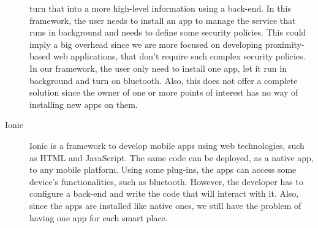 \begin{description}
  turn that into a more high-level information 
  using a back-end. In this framework,
  the user needs to install an app to manage the service
  that runs in background and needs to define some
  security policies. This could imply a big overhead since
  we are more focused on developing proximity-based
  web applications, that don't require such complex security
  policies. In our framework, the user only need to
  install one app, let it run in background and turn on
  bluetooth. Also, this does not offer a complete solution
  since the owner of one or more points of interest
  has no way of installing new apps on them.
  \item[Ionic] Ionic is a framework to develop mobile apps
  using web technologies, such as HTML and JavaScript. The
  same code can be deployed, as a native app, to any mobile
  platform. Using some plug-ins, the apps can access some
  device's functionalities, such as bluetooth. However,
  the developer has to configure a back-end and write the
  code that will interact with it. Also, since the apps are
  installed like native ones, we still have the problem of
  having one app for each smart place.
\end{description}
